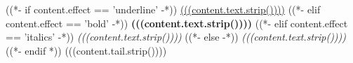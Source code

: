 ((*- if content.effect == 'underline' -*))
 \uline{ (((content.text.strip())))} 
((*- elif content.effect == 'bold' -*))
 \textbf{ (((content.text.strip())))} 
((*- elif content.effect == 'italics' -*))
 \textit{ (((content.text.strip())))} 
((*- else -*))
 \emph{ (((content.text.strip())))} 
((*- endif *)) (((content.tail.strip())))
